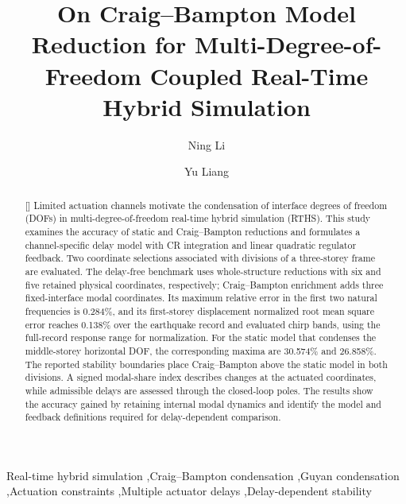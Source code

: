 \documentclass[a4paper,fleqn,review,12pt]{cas-sc}
\numberwithin{equation}{section}
\newcommand{\rev}[1]{{\color{red}#1}}
\begin{document}
\let\WriteBookmarks\relax
\def\floatpagepagefraction{1}
\def\textpagefraction{.001}

\title[mode=title]{On Craig--Bampton Model Reduction for Multi-Degree-of-Freedom Coupled Real-Time Hybrid Simulation}

\author{Ning Li}
\author{Yu Liang}

\begin{abstract}[]
\rev{Limited actuation channels motivate the condensation of interface degrees of freedom (DOFs) in multi-degree-of-freedom real-time hybrid simulation (RTHS). This study examines the accuracy of static and Craig--Bampton reductions and formulates a channel-specific delay model with CR integration and linear quadratic regulator feedback. Two coordinate selections associated with divisions of a three-storey frame are evaluated. The delay-free benchmark uses whole-structure reductions with six and five retained physical coordinates, respectively; Craig--Bampton enrichment adds three fixed-interface modal coordinates. Its maximum relative error in the first two natural frequencies is 0.284\%, and its first-storey displacement normalized root mean square error reaches 0.138\% over the earthquake record and evaluated chirp bands, using the full-record response range for normalization. For the static model that condenses the middle-storey horizontal DOF, the corresponding maxima are 30.574\% and 26.858\%. The reported stability boundaries place Craig--Bampton above the static model in both divisions. A signed modal-share index describes changes at the actuated coordinates, while admissible delays are assessed through the closed-loop poles. The results show the accuracy gained by retaining internal modal dynamics and identify the model and feedback definitions required for delay-dependent comparison.}

\end{abstract}

\begin{keywords}
	\raggedright
	Real-time hybrid simulation
	\sep Craig--Bampton condensation
	\sep Guyan condensation
	\sep Actuation constraints
	\sep Multiple actuator delays
	\sep Delay-dependent stability
\end{keywords}

\shorttitle{\mbox{}}

\maketitle
\linenumbers
\end{document}

